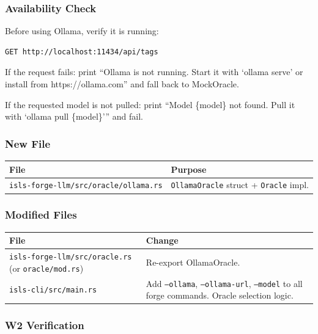 \documentclass[11pt,a4paper]{article}
\begin{document}
\subsubsection{Availability Check}

Before using Ollama, verify it is running:

\begin{lstlisting}[style=bash]
GET http://localhost:11434/api/tags
\end{lstlisting}

If the request fails: print ``Ollama is not running. Start it 
with `ollama serve' or install from https://ollama.com'' and fall 
back to MockOracle.

If the requested model is not pulled: print ``Model \{model\} not 
found. Pull it with `ollama pull \{model\}''' and fail.

\subsubsection{New File}

\begin{longtable}{lp{10cm}}
\toprule
\textbf{File} & \textbf{Purpose} \\
\midrule
\texttt{isls-forge-llm/src/oracle/ollama.rs}
  & \texttt{OllamaOracle} struct + \texttt{Oracle} impl. \\
\bottomrule
\end{longtable}

\subsubsection{Modified Files}

\begin{longtable}{lp{10cm}}
\toprule
\textbf{File} & \textbf{Change} \\
\midrule
\texttt{isls-forge-llm/src/oracle.rs} (or \texttt{oracle/mod.rs})
  & Re-export OllamaOracle. \\
\texttt{isls-cli/src/main.rs}
  & Add \texttt{--ollama}, \texttt{--ollama-url}, 
    \texttt{--model} to all forge commands. Oracle selection 
    logic. \\
\bottomrule
\end{longtable}

\subsubsection{W2 Verification}
\end{document}
